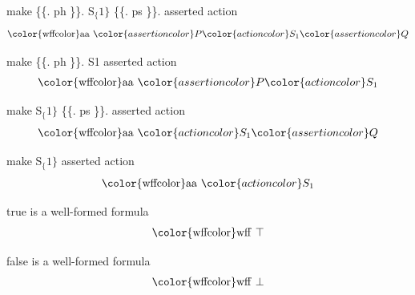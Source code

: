 \begin{lemma} make \{\{. ph \}\}. S$_\{1\}$ \{\{. ps \}\}.
asserted action
\begin{align}
{\rm\color{wffcolor}aa}~ {\color{assertioncolor}P} {\color{actioncolor}S_1}
    {\color{assertioncolor}Q}\label{aapsq}
\end{align}
\end{lemma}

\begin{lemma} make \{\{. ph \}\}. S1 asserted action
\begin{align}
{\rm\color{wffcolor}aa}~ {\color{assertioncolor}P}
    {\color{actioncolor}S_1}\label{aaps}
\end{align}
\end{lemma}

\begin{lemma} make S$_\{1\}$ \{\{. ps \}\}. asserted action
\begin{align}
{\rm\color{wffcolor}aa}~ {\color{actioncolor}S_1}
    {\color{assertioncolor}Q}\label{aasq}
\end{align}
\end{lemma}

\begin{lemma} make  S$_\{1\}$ asserted action
\begin{align}
{\rm\color{wffcolor}aa}~ {\color{actioncolor}S_1}\label{aas}
\end{align}
\end{lemma}

\begin{lemma} true is a well-formed formula
\begin{align}
{\rm\color{wffcolor} wff~} \top\label{wtrue}
\end{align}
\end{lemma}

\begin{lemma} false is a well-formed formula
\begin{align}
{\rm\color{wffcolor} wff~} \bot\label{wfalse}
\end{align}
\end{lemma}

